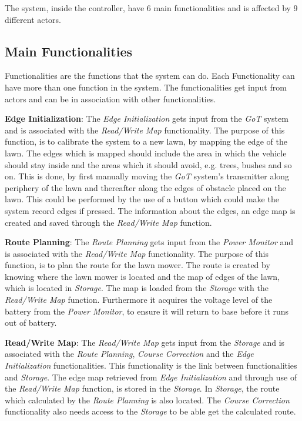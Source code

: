 \noindent
\newpage

The system, inside the controller, have 6 main functionalities and is affected by 9 different actors.

\subsection{Main Functionalities}

Functionalities are the functions that the system can do. Each Functionality can have more than one function in the system. The functionalities get input from actors and can be in association with other functionalities. 

\textbf{Edge Initialization}:
The \textit{Edge Initialization} gets input from the \textit{GoT} system and is associated with the \textit{Read/Write Map} functionality. The purpose of this function, is to calibrate the system to a new lawn, by mapping the edge of the lawn. The edges which is mapped should include the area in which the vehicle should stay inside and the areas which it should avoid, e.g. trees, bushes and so on. This is done, by first manually moving the \textit{GoT} system's transmitter along periphery of the lawn and thereafter along the edges of obstacle placed on the lawn. This could be performed by the use of a button which could make the system record edges if pressed. The information about the edges, an edge map is created and saved through the \textit{Read/Write Map} function.

\textbf{Route Planning}:
The \textit{Route Planning} gets input from the \textit{Power Monitor} and is associated with the \textit{Read/Write Map} functionality. The purpose of this function, is to plan the route for the lawn mower. The route is created by knowing where the lawn mower is located and the map of edges of the lawn, which is located in \textit{Storage}. The map is loaded from the \textit{Storage} with the \textit{Read/Write Map} function. Furthermore it acquires the voltage level of the battery from the \textit{Power Monitor}, to ensure it will return to base before it runs out of battery.

\textbf{Read/Write Map}:
The \textit{Read/Write Map} gets input from the \textit{Storage} and is associated with the \textit{Route Planning}, \textit{Course Correction} and the \textit{Edge Initialization} functionalities. This functionality is the link between functionalities and \textit{Storage}. The edge map retrieved from \textit{Edge Initialization} and through use of the \textit{Read/Write Map} function, is stored in the \textit{Storage}. In \textit{Storage}, the route which calculated by the \textit{Route Planning} is also located. The \textit{Course Correction} functionality also needs access to the \textit{Storage} to be able get the calculated route.

